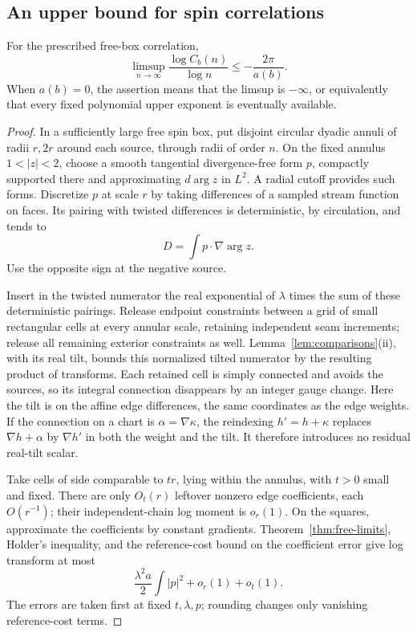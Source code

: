 \subsection{An upper bound for spin correlations}

\begin{proposition}\label{prop:spin-upper}
For the prescribed free-box correlation,
\begin{equation}
 \limsup_{n\to\infty}\frac{\log C_b(n)}{\log n}
       \le-\frac{2\pi}{a(b)}.
 \label{eq:spin-upper}
\end{equation}
When \(a(b)=0\), the assertion means that the limsup is
\(-\infty\), or equivalently that every fixed polynomial
upper exponent is eventually available.
\end{proposition}

\begin{proof}
In a sufficiently large free spin box, put disjoint circular
dyadic annuli of radii \(r,2r\) around each source, through
radii of order \(n\). On the fixed annulus \(1<|z|<2\),
choose a smooth tangential divergence-free form \(p\),
compactly supported there and approximating \(d\arg z\)
in \(L^2\). A radial cutoff provides such forms.
Discretize \(p\) at scale \(r\) by taking differences of a
sampled stream function on faces. Its pairing with twisted
differences is deterministic, by circulation, and tends to
\[
 D=\int p\cdot\nabla\arg z.
\]
Use the opposite sign at the negative source.

Insert in the twisted numerator the real exponential of
\(\lambda\) times the sum of these deterministic pairings.
Release endpoint constraints between a grid of small
rectangular cells at every annular scale, retaining
independent seam increments; release all remaining exterior
constraints as well. Lemma~\ref{lem:comparisons}(ii), with
its real tilt, bounds this normalized tilted numerator by
the resulting product of transforms.
Each retained cell is simply connected and avoids the
sources, so its integral connection disappears by an
integer gauge change.
Here the tilt is on the affine edge differences, the same
coordinates as the edge weights. If the connection on a chart
is \(\alpha=\nabla\kappa\), the reindexing \(h'=h+\kappa\)
replaces \(\nabla h+\alpha\) by \(\nabla h'\) in both the
weight and the tilt. It therefore introduces no residual
real-tilt scalar.

Take cells of side comparable to \(tr\), lying within the
annulus, with \(t>0\) small and fixed. There are only
\(O_t(r)\) leftover nonzero edge coefficients, each
\(O(r^{-1})\); their independent-chain log moment is
\(o_r(1)\). On the squares, approximate the coefficients by
constant gradients. Theorem~\ref{thm:free-limits}, Holder's
inequality, and the reference-cost bound on the coefficient
error give log transform at most
\[
 \frac{\lambda^2a}{2}\int|p|^2+o_r(1)+o_t(1).
\]
The errors are taken first at fixed \(t,\lambda,p\); rounding
changes only vanishing reference-cost terms.


\end{proof}

